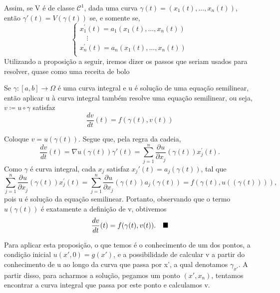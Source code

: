 \documentclass[../pde_notes.tex]{subfiles}
\begin{document}
\begin{example}
	Assim, se V é de classe \(\mathcal{C}^{1}\), dada uma curva \(\gamma (t) = (x_1(t), \dotsc , x_{n}(t))\), então \(\gamma'(t) = V(\gamma (t))\) se, e somente se,
	\[
		\left\{\begin{array}{ll}
			x_{1}^{'}(t) = a_1(x_1(t), \dotsc , x_{n}(t)) \\
			\quad \vdots                                  \\
			x_{n}^{'}(t) = a_n(x_1(t), \dotsc , x_{n}(t)) \\
		\end{array}\right.
	\]
	Utilizando a proposição a seguir, iremos dizer os passos que seriam usados para resolver, quase como uma receita de bolo
	\begin{prop*}
		Se \(\gamma :[a, b]\rightarrow \Omega \) é uma curva integral e u é solução de uma equação semilinear, então aplicar u à curva integral também resolve uma equação semilinear, ou seja, \(v\coloneqq u\circ \gamma \) satisfaz
		\[
			\frac{dv}{dt}(t) = f(\gamma (t), v(t))
		\]
	\end{prop*}
	\begin{proof*}
		Coloque \(v = u(\gamma (t))\). Segue que, pela regra da cadeia,
		\[
			\frac{dv}{dt}(t) = \nabla u(\gamma (t)) \gamma '(t) = \sum\limits_{j=1}^{n}\frac{\partial^{}u}{\partial x_{j}^{}}(\gamma (t))x_{j}^{'}(t).
		\]
		Como \(\gamma \) é curva integral, cada \(x_{j}\) satisfaz \(x_{j}'(t) = a_{j}(\gamma (t))\), tal que
		\[
			\sum\limits_{j=1}^{n}\frac{\partial^{}u}{\partial x_{j}^{}}(\gamma (t))x_{j}^{'}(t) = \sum\limits_{j=1}^{n}\frac{\partial^{}u}{\partial x_{j}^{}}(\gamma (t))a_{j}(\gamma (t)) = f(\gamma (t), u((\gamma (t)))),
		\]
		pois u é solução da equação semilinear. Portanto, observando que o termo \(u(\gamma (t))\) é exatamente a definição de v, obtivemos
		\[
			\frac{dv}{dt}(t) = f(\gamma (t), v(t)).\quad \text{$\blacksquare$}
		\]
	\end{proof*}

	Para aplicar esta proposição, o que temos é o conhecimento de um dos pontos, a condição inicial \(u(x', 0) = g(x')\), e a possibilidade de calcular v a partir do conhecimento de u ao longo da curva que passa por x', a qual denotamos \(\gamma_{x'}.\)
	A partir disso, para acharmos a solução, pegamos um ponto \((x', x_{n})\), tentamos encontrar a curva integral que passa por este ponto e calculamos v.


\end{example}
\end{document}
